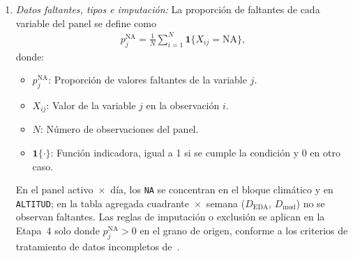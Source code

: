 \begin{enumerate}
    \item \textit{Datos faltantes, tipos e imputación:}
    La proporción de faltantes de cada variable del panel se define como
    \begin{equation}
        \begin{aligned}
        p_j^{\mathrm{NA}} = \frac{1}{N}\sum_{i=1}^{N} \mathbf{1}\{X_{ij} = \mathrm{NA}\},
        \end{aligned}
        \label{eq:prop_na}
    \end{equation}
    donde:
    \begin{itemize}
        \item $p_j^{\mathrm{NA}}$: Proporción de valores faltantes de la variable $j$.
        \item $X_{ij}$: Valor de la variable $j$ en la observación $i$.
        \item $N$: Número de observaciones del panel.
        \item $\mathbf{1}\{\cdot\}$: Función indicadora, igual a 1 si se cumple la condición y 0 en otro caso.
    \end{itemize}
    En el panel activo~$\times$~día, los \texttt{NA} se concentran en el bloque climático y en \texttt{ALTITUD}; en la tabla agregada cuadrante~$\times$~semana ($D_{\mathrm{EDA}}$, $D_{\mathrm{mod}}$) no se observan faltantes. Las reglas de imputación o exclusión se aplican en la Etapa~4 solo donde $p_j^{\mathrm{NA}}>0$ en el grano de origen, conforme a los criterios de tratamiento de datos incompletos de~\cite{ref49}.


\end{enumerate}
